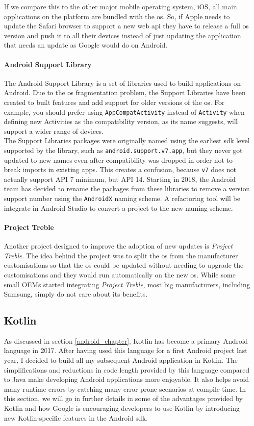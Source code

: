 \documentclass[twoside, openright,11pt,a4paper]{book}
\begin{document}
If we compare this to the other major mobile operating system, iOS, all main applications on the platform are bundled with the \gls{os}. So, if Apple needs to update the Safari browser to support a new web \gls{api} they have to release a full \gls{os} version and push it to all their devices instead of just updating the application that needs an update as Google would do on Android.
\paragraph{Android Support Library}
The Android Support Library is a set of libraries used to build applications on Android. Due to the \gls{os} fragmentation problem, the Support Libraries have been created to built features and add support for older versions of the \gls{os}. For example, you should prefer using \verb+AppCompatActivity+ instead of \verb+Activity+ when defining new Activities as the compatibility version, as its name suggests, will support a wider range of devices.\\

The Support Libraries packages were originally named using the earliest \gls{sdk} level supported by the library, such as \verb+android.support.v7.app+, but they never got updated to new names even after compatibility was dropped in order not to break imports in existing apps. This creates a confusion, because \verb+v7+ does not actually support API 7 minimum, but API 14. Starting in 2018, the Android team has decided to rename the packages from these libraries to remove a version support number using the \verb+AndroidX+\cite{android:doc:androidx} naming scheme. A refactoring tool will be integrate in Android Studio to convert a project to the new naming scheme.
\paragraph{Project Treble}
Another project designed to improve the adoption of new updates is \emph{Project Treble}. The idea behind the project was to split the \gls{os} from the manufacturer customisations so that the \gls{os} could be updated without needing to upgrade the customisations and they would run automatically on the new \gls{os}. While some small OEMs started integrating \emph{Project Treble}, most big manufacturers, including Samsung, simply do not care about its benefits.
\subsection{Kotlin}
\label{kotlin}
As discussed in section \ref{android_chapter}, Kotlin has become a primary Android language in 2017. After having used this language for a first Android project last year, I decided to build all my subsequent Android application in Kotlin. The simplifications and reductions in code length provided by this language compared to Java make developing Android applications more enjoyable. It also helps avoid many runtime errors by catching many error-prone scenarios at compile time. In this section, we will go in further details in some of the advantages provided by Kotlin and how Google is encouraging developers to use Kotlin by introducing new Kotlin-specific features in the Android \gls{sdk}.
\end{document}
